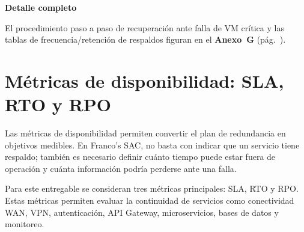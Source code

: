 \documentclass[11pt, a4paper, oneside]{report}
\newenvironment{notabox}[1]{%
  \begin{lrbox}{\notaboxsb}%
  \begin{minipage}{\dimexpr\textwidth-2\fboxsep\relax}%
  \vspace{4pt}\textcolor{upeu_dark}{\textbf{#1}}\\[2pt]\small%
}{%
  \vspace{4pt}%
  \end{minipage}%
  \end{lrbox}%
  \vspace{6pt}\par\noindent\colorbox{upeu_light}{\usebox{\notaboxsb}}\par\vspace{6pt}%
}
\begin{document}
\begin{notabox}{Detalle completo}
El procedimiento paso a paso de recuperación ante falla de VM crítica y las tablas de frecuencia/retención de respaldos figuran en el \textbf{Anexo~G} (pág.~\pageref{anex:respaldo}).
\end{notabox}
\section{Métricas de disponibilidad: SLA, RTO y RPO}

Las métricas de disponibilidad permiten convertir el plan de redundancia en objetivos medibles. En Franco's SAC, no basta con indicar que un servicio tiene respaldo; también es necesario definir cuánto tiempo puede estar fuera de operación y cuánta información podría perderse ante una falla.

Para este entregable se consideran tres métricas principales: SLA, RTO y RPO. Estas métricas permiten evaluar la continuidad de servicios como conectividad WAN, VPN, autenticación, API Gateway, microservicios, bases de datos y monitoreo.

\renewcommand{\arraystretch}{1.3}
\footnotesize
{}
\end{document}
